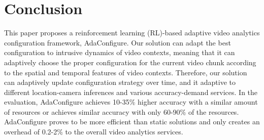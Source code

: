\section{Conclusion}
\label{Section: conclusion}

This paper proposes a reinforcement learning (RL)-based adaptive video analytics configuration framework, AdaConfigure. Our solution can adapt the best configuration to intrusive dynamics of video contexts, meaning that it can adaptively choose the proper configuration for the current video chunk according to the spatial and temporal features of video contexts. Therefore, our solution can adaptively update configuration strategy over time, and it adaptive to different location-camera inferences and various accuracy-demand services. In the evaluation, AdaConfigure achieves 10-35\% higher accuracy with a similar amount of resources or achieves similar accuracy with only 60-90\% of the resources. AdaConfigure proves to be more efficient than static solutions and only creates an overhead of 0.2-2\% to the overall video analytics services. 